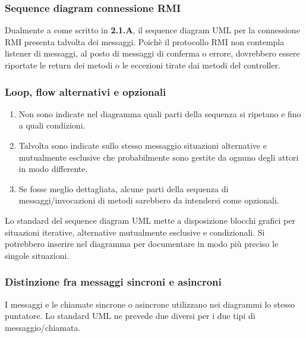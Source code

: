 \documentclass[12pt]{article}
\begin{document}
 \subsubsection{Sequence diagram connessione RMI}
 Dualmente a come scritto in \textbf{2.1.A}, il sequence diagram UML per la connessione RMI presenta talvolta dei messaggi. Poichè il protocollo RMI non contempla listener di messaggi, al posto di messaggi di conferma o errore, dovrebbero essere riportate le return dei metodi o le eccezioni tirate dai metodi del controller.

\subsubsection{Loop, flow alternativi e opzionali} 
\begin{enumerate}
    \item Non sono indicate nel diagramma quali parti della sequenza si ripetano e fino a quali condizioni.
    \item Talvolta sono indicate sullo stesso messaggio situazioni alternative e mutualmente esclusive che probabilmente sono gestite da ognuno degli attori in modo differente.  
    \item Se fosse meglio dettagliata, alcune parti della sequenza di messaggi/invocazioni di metodi sarebbero da intendersi come opzionali.
\end{enumerate}

Lo standard del sequence diagram UML mette a disposizione blocchi grafici per situazioni iterative, alternative mutualmente esclusive e condizionali. Si potrebbero inserire nel diagramma per documentare in modo più preciso le singole situazioni.

\subsubsection{Distinzione fra messaggi sincroni e asincroni}
I messaggi e le chiamate sincrone o asincrone utilizzano nei diagrammi lo stesso puntatore. Lo standard UML ne prevede due diversi per i due tipi di messaggio/chiamata.
\end{document}
